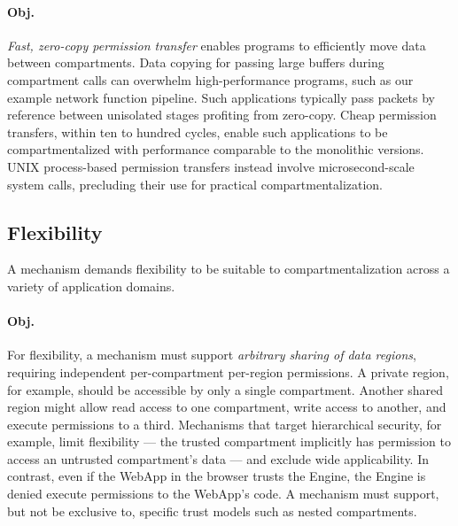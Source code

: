 \paragraph{Obj. }
\emph{Fast, zero-copy permission transfer} enables programs to 
efficiently move data between compartments.
Data copying for passing large buffers during 
compartment calls can overwhelm high-performance programs, 
such as our example network function pipeline.
Such applications typically pass packets by reference between 
unisolated stages profiting from zero-copy.
Cheap permission transfers, within ten to hundred cycles, enable 
such applications to be compartmentalized with performance
comparable to the monolithic versions.
UNIX process-based permission transfers instead involve microsecond-scale
system calls, precluding their use for practical compartmentalization.

\subsection{Flexibility}
\label{sec:reqs:flexibility}

A mechanism demands flexibility to be suitable
to compartmentalization across a variety of application domains. 

\paragraph{Obj. }
For flexibility, a mechanism must support \emph{arbitrary sharing of data
regions},
requiring independent per-compartment per-region permissions.
A private region, for example, should be accessible by only a single
compartment.
Another shared region might allow read access to one compartment, 
write access to another, and execute permissions to a third.
Mechanisms that target hierarchical security, for example, limit
flexibility --- the trusted  compartment implicitly has permission
to access an untrusted compartment's data --- and exclude wide 
applicability.
In contrast, even if the WebApp in the browser trusts the Engine,
the Engine is denied execute permissions to the WebApp's code.
A mechanism must support, but not be exclusive to, specific trust
models such as nested compartments.


